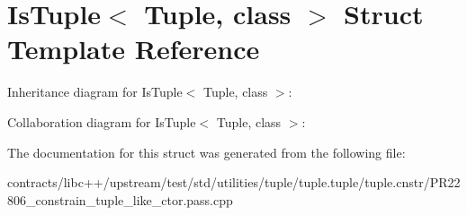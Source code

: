 \hypertarget{struct_is_tuple}{}\section{Is\+Tuple$<$ Tuple, class $>$ Struct Template Reference}
\label{struct_is_tuple}


Inheritance diagram for Is\+Tuple$<$ Tuple, class $>$\+:


Collaboration diagram for Is\+Tuple$<$ Tuple, class $>$\+:


The documentation for this struct was generated from the following file\+:\begin{DoxyCompactItemize}
\item 
contracts/libc++/upstream/test/std/utilities/tuple/tuple.\+tuple/tuple.\+cnstr/P\+R22806\+\_\+constrain\+\_\+tuple\+\_\+like\+\_\+ctor.\+pass.\+cpp\end{DoxyCompactItemize}
